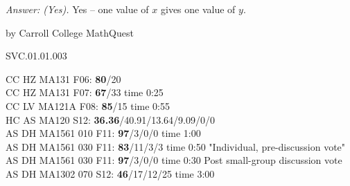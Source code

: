 {\it Answer: (Yes).} Yes -- one value of $x$ gives one value of $y$.

\medskip




by Carroll College MathQuest

SVC.01.01.003


CC HZ MA131 F06: {\bf 80}/20 \\
CC HZ MA131 F07: {\bf 67}/33 time 0:25 \\ 
CC LV MA121A F08: {\bf 85}/15 time 0:55 \\
HC AS MA120 S12: {\bf 36.36}/40.91/13.64/9.09/0/0  \\
AS DH MA1561 010 F11: {\bf 97}/3/0/0 time 1:00  \\
AS DH MA1561 030 F11: {\bf 83}/11/3/3 time 0:50 "Individual, pre-discussion vote" \\
AS DH MA1561 030 F11: {\bf 97}/3/0/0 time 0:30 Post small-group discussion vote \\
AS DH MA1302 070 S12: {\bf 46}/17/12/25 time 3:00  \\
